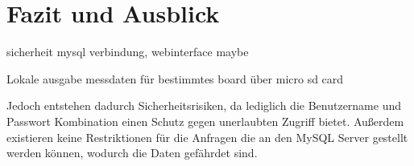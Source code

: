 \chapter{Fazit und Ausblick}
\label{chapter_FazitUndAusblick}
sicherheit mysql verbindung, webinterface maybe

Lokale ausgabe messdaten für bestimmtes board über micro sd card

Jedoch entstehen dadurch Sicherheitsrisiken, da lediglich die Benutzername und Passwort Kombination einen Schutz gegen unerlaubten Zugriff bietet. Außerdem existieren keine Restriktionen für die Anfragen die an den MySQL Server gestellt werden können, wodurch die Daten gefährdet sind.